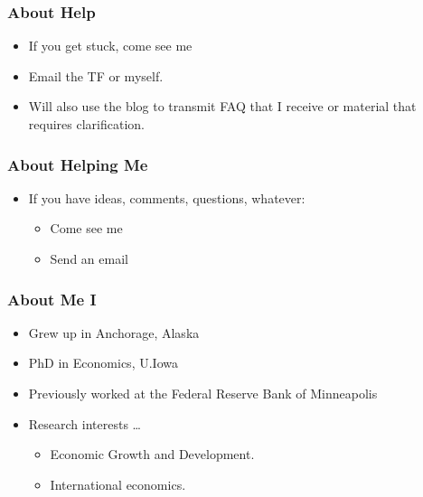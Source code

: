 \documentclass[10pt]{beamer}
\begin{document}
\begin{frame}[t]
\frametitle{About Help}
\begin{itemize}
\item If you get stuck, come see me
\bigskip
\item Email the TF or myself.
\bigskip
\item Will also use the blog to transmit FAQ that I receive or material that requires clarification.
\end{itemize}
\end{frame}



\begin{frame}[t]
\frametitle{About Helping Me}
\begin{itemize}
\item If you have ideas, comments, questions, whatever:
\begin{itemize}
\medskip
\item Come see me
\medskip
\item Send an email
\end{itemize}
\end{itemize}
\end{frame}


\begin{frame}[t]
\frametitle{About Me I}
\begin{itemize}
\item Grew up in Anchorage, Alaska
\bigskip
\item PhD in Economics, U.Iowa
\bigskip
\item Previously worked at the Federal Reserve Bank of Minneapolis
\bigskip
\item Research interests \ldots
\begin{itemize}
\medskip
\item Economic Growth and Development.
\medskip
\item International economics.
\medskip
\end{itemize}
\end{itemize}
\bigskip
\end{frame}
\end{document}
